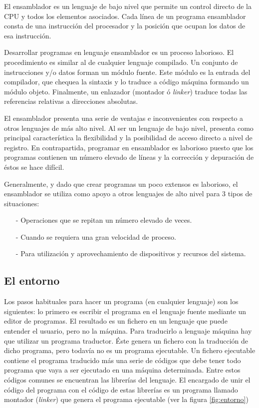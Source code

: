 El ensamblador es un lenguaje de bajo nivel que permite un control
directo de la CPU y todos los elementos asociados. Cada línea de un
programa ensamblador consta de una instrucción del procesador y la
posición que ocupan los datos de esa instrucción.

Desarrollar programas en lenguaje ensamblador es un proceso laborioso.
El procedimiento es similar al de cualquier lenguaje compilado.
Un conjunto de instrucciones y/o datos forman un módulo fuente.
Este módulo es la entrada del compilador, que chequea la sintaxis y lo
traduce a código máquina formando un módulo objeto.
Finalmente, un enlazador (montador ó {\it linker}) traduce todas las
referencias relativas a direcciones absolutas.

El ensamblador presenta una serie de ventajas e inconvenientes con
respecto a otros lenguajes de más alto nivel. Al ser un lenguaje de
bajo nivel, presenta como principal característica la flexibilidad y
la posibilidad de acceso directo a nivel de registro. En
contrapartida, programar en ensamblador es laborioso puesto que los
programas contienen un número elevado de líneas y la corrección y
depuración de éstos se hace difícil.

Generalmente, y dado que crear programas un poco extensos es
laborioso, el ensamblador se utiliza como apoyo a otros lenguajes
de alto nivel para 3 tipos de situaciones:
\begin{itemize}
     \item[-] Operaciones que se repitan un número elevado de veces.
     \item[-] Cuando se requiera una gran velocidad de proceso.
     \item[-] Para utilización y aprovechamiento de dispositivos y
     recursos del sistema.
\end{itemize}

\subsection{El entorno}

Los pasos habituales para hacer un programa (en cualquier lenguaje) son 
los siguientes:
lo primero es escribir el programa en el lenguaje fuente
mediante un editor de programas.
El resultado es un fichero en un lenguaje que puede entender el usuario,
pero no la máquina.
Para traducirlo a lenguaje máquina hay que utilizar un programa traductor.
Éste genera un fichero con la traducción de dicho programa, pero todavía
no es un programa ejecutable.
Un fichero ejecutable contiene el programa traducido más una serie de
códigos que debe tener todo programa que vaya a ser ejecutado en una
máquina determinada.
Entre estos códigos comunes se encuentran las librerías del lenguaje.
El encargado de unir el código del programa con el código de estas
librerías es un programa llamado montador ({\it linker}) que genera el
programa ejecutable (ver la figura \ref{fig:entorno})


